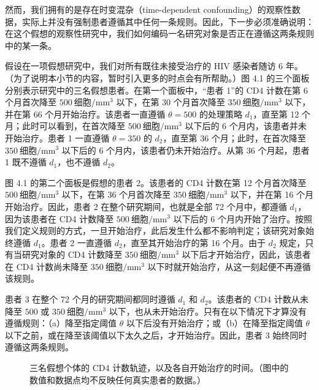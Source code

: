 然而，我们拥有的是存在时变混杂（time-dependent confounding）的观察性数据，实际上并没有强制患者遵循其中任何一条规则。因此，下一步必须准确说明：在这个假想的观察性研究中，我们如何编码一名研究对象是否正在遵循这两条规则中的某一条。

假设在一项假想研究中，我们对所有既往未接受治疗的 HIV 感染者随访 6 年。（为了说明本小节的内容，暂时引入更多的时点会有所帮助。）图 4.1 的三个面板分别表示研究中的三名假想患者。在第一个面板中，“患者 1”的 CD4 计数在第 6 个月首次降至 $500\ \text{细胞}/\mathrm{mm}^3$ 以下，在第 30 个月首次降至 $350\ \text{细胞}/\mathrm{mm}^3$ 以下，并在第 66 个月开始治疗。该患者一直遵循 $\theta=500$ 的处理策略 $d_1$，直至第 12 个月；此时可以看到，在首次降至 $500\ \text{细胞}/\mathrm{mm}^3$ 以下后的 6 个月内，该患者并未开始治疗。患者 1 一直遵循 $\theta=350$ 的 $d_2$，直至第 36 个月；此时，在首次降至 $350\ \text{细胞}/\mathrm{mm}^3$ 以下后的 6 个月内，该患者仍未开始治疗。从第 36 个月起，患者 1 既不遵循 $d_1$，也不遵循 $d_2$。

图 4.1 的第二个面板是假想的患者 2。该患者的 CD4 计数在第 12 个月首次降至 $500\ \text{细胞}/\mathrm{mm}^3$ 以下，在第 36 个月首次降至 $350\ \text{细胞}/\mathrm{mm}^3$ 以下，并在第 16 个月开始治疗。因此，患者 2 在整个研究期间，也就是全部 72 个月中，都遵循 $d_1$，因为该患者在 CD4 计数降至 $500\ \text{细胞}/\mathrm{mm}^3$ 以下后的 6 个月内开始了治疗。按照我们定义规则的方式，一旦开始治疗，此后发生什么都不影响判定；该研究对象始终遵循 $d_1$。患者 2 一直遵循 $d_2$，直至其开始治疗的第 16 个月。由于 $d_2$ 规定，只有当研究对象的 CD4 计数降至 $350\ \text{细胞}/\mathrm{mm}^3$ 以下后才开始治疗，因此，该患者在 CD4 计数尚未降至 $350\ \text{细胞}/\mathrm{mm}^3$ 以下时就开始治疗，从这一刻起便不再遵循该规则。

患者 3 在整个 72 个月的研究期间都同时遵循 $d_1$ 和 $d_2$。该患者的 CD4 计数从未降至 $500$ 或 $350\ \text{细胞}/\mathrm{mm}^3$ 以下，也从未开始治疗。只有在以下情况下才算没有遵循规则：（a）降至指定阈值 $\theta$ 以下后没有开始治疗；或（b）在降至指定阈值 $\theta$ 以下之前，或在降至该阈值以下太久之后，才开始治疗。因此，患者 3 始终同时遵循这两条规则。

\begin{figure}[p]
 \centering
 
 \caption{三名假想个体的 CD4 计数轨迹，以及各自开始治疗的时间。（图中的数值和数据点均不反映任何真实患者的数据。）}
 \label{fig:ch04-cd4-trajectories}
\end{figure}
\FloatBarrier

